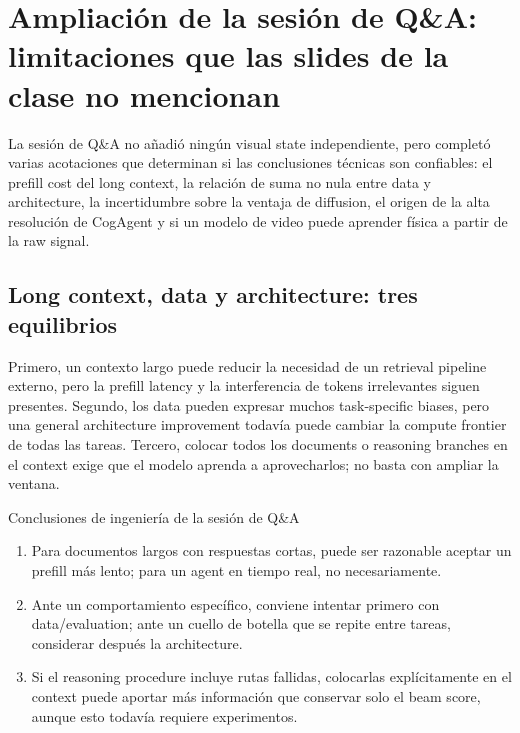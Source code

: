 \section{Ampliación de la sesión de Q\&A: limitaciones que las slides de la clase no mencionan}

La sesión de Q\&A no añadió ningún visual state independiente, pero completó varias acotaciones que determinan si las conclusiones técnicas son confiables: el prefill cost del long context, la relación de suma no nula entre data y architecture, la incertidumbre sobre la ventaja de diffusion, el origen de la alta resolución de CogAgent y si un modelo de video puede aprender física a partir de la raw signal.

\subsection{Long context, data y architecture: tres equilibrios}

Primero, un contexto largo puede reducir la necesidad de un retrieval pipeline externo, pero la prefill latency y la interferencia de tokens irrelevantes siguen presentes. Segundo, los data pueden expresar muchos task-specific biases, pero una general architecture improvement todavía puede cambiar la compute frontier de todas las tareas. Tercero, colocar todos los documents o reasoning branches en el context exige que el modelo aprenda a aprovecharlos; no basta con ampliar la ventana.

\begin{importantbox}{Conclusiones de ingeniería de la sesión de Q\&A}
\begin{enumerate}
  \item Para documentos largos con respuestas cortas, puede ser razonable aceptar un prefill más lento; para un agent en tiempo real, no necesariamente.
  \item Ante un comportamiento específico, conviene intentar primero con data/evaluation; ante un cuello de botella que se repite entre tareas, considerar después la architecture.
  \item Si el reasoning procedure incluye rutas fallidas, colocarlas explícitamente en el context puede aportar más información que conservar solo el beam score, aunque esto todavía requiere experimentos.
\end{enumerate}
\end{importantbox}


